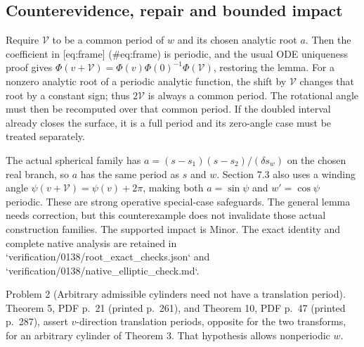 \documentclass[10pt]{article}
\begin{document}
\subsection*{Counterevidence, repair and bounded impact}
Require \(\mathcal V\) to be a common period of \(w\) and its chosen analytic root \(a\). Then the coefficient in [eq:frame] (\#eq:frame) is periodic, and the usual ODE uniqueness proof gives \(\Phi(v+\mathcal V)=\Phi(v)\Phi(0)^{-1}\Phi(\mathcal V)\), restoring the lemma. For a nonzero analytic root of a periodic analytic function, the shift by \(\mathcal V\) changes that root by a constant sign; thus \(2\mathcal V\) is always a common period. The rotational angle must then be recomputed over that common period. If the doubled interval already closes the surface, it is a full period and its zero-angle case must be treated separately.\par
The actual spherical family has \(a=(s-s_1)(s-s_2)/(\delta s_w)\) on the chosen real branch, so \(a\) has the same period as \(s\) and \(w\). Section 7.3 also uses a winding angle \(\psi(v+\mathcal V)=\psi(v)+2\pi\), making both \(a=\sin\psi\) and \(w'=\cos\psi\) periodic. These are strong operative special-case safeguards. The general lemma needs correction, but this counterexample does not invalidate those actual construction families. The supported impact is Minor. The exact identity and complete native analysis are retained in `verification/0138/root\_exact\_checks.json` and `verification/0138/native\_elliptic\_check.md`.\par
Problem 2 (Arbitrary admissible cylinders need not have a translation period).  Theorem 5, PDF p. 21 (printed p. 261), and Theorem 10, PDF p. 47 (printed p. 287), assert \(v\)-direction translation periods, opposite for the two transforms, for an arbitrary cylinder of Theorem 3. That hypothesis allows nonperiodic \(w\).\par
\end{document}
